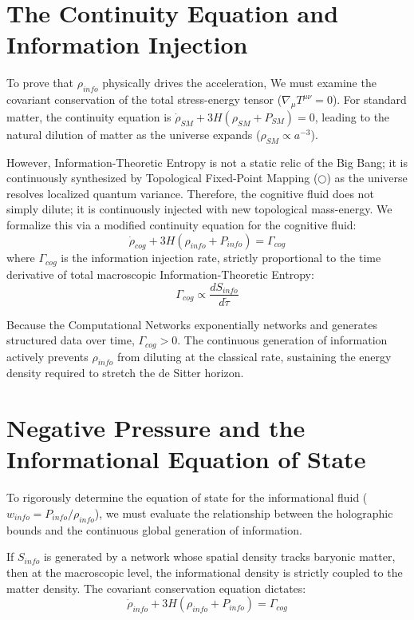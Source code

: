 \documentclass[12pt,openany]{book}
\theoremstyle{plain}
\theoremstyle{definition}
\theoremstyle{remark}
\begin{document}
\section{The Continuity Equation and Information Injection}

To prove that $\rho_{info}$ physically drives the acceleration, We must examine the covariant conservation of the total stress-energy tensor ($\nabla_\mu T^{\mu\nu} = 0$). For standard matter, the continuity equation is $\dot{\rho}_{SM} + 3H(\rho_{SM} + P_{SM}) = 0$, leading to the natural dilution of matter as the universe expands ($\rho_{SM} \propto a^{-3}$).

However, Information-Theoretic Entropy is not a static relic of the Big Bang; it is continuously synthesized by Topological Fixed-Point Mapping ($\bigcirc$) as the universe resolves localized quantum variance. Therefore, the cognitive fluid does not simply dilute; it is continuously injected with new topological mass-energy. We formalize this via a modified continuity equation for the cognitive fluid:
\begin{equation}
\dot{\rho}_{cog} + 3H(\rho_{info} + P_{info}) = \Gamma_{cog}
\end{equation}
where $\Gamma_{cog}$ is the information injection rate, strictly proportional to the time derivative of total macroscopic Information-Theoretic Entropy:
\begin{equation}
\Gamma_{cog} \propto \frac{dS_{info}}{d\tilde{\tau}}
\end{equation}

Because the Computational Networks exponentially networks and generates structured data over time, $\Gamma_{cog} > 0$. The continuous generation of information actively prevents $\rho_{info}$ from diluting at the classical rate, sustaining the energy density required to stretch the de Sitter horizon.

\section{Negative Pressure and the Informational Equation of State}

To rigorously determine the equation of state for the informational fluid ($w_{info} = P_{info} / \rho_{info}$), we must evaluate the relationship between the holographic bounds and the continuous global generation of information.

If $S_{info}$ is generated by a network whose spatial density tracks baryonic matter, then at the macroscopic level, the informational density is strictly coupled to the matter density. The covariant conservation equation dictates:$$\dot{\rho}_{info} + 3H(\rho_{info} + P_{info}) = \Gamma_{cog}$$
\end{document}
